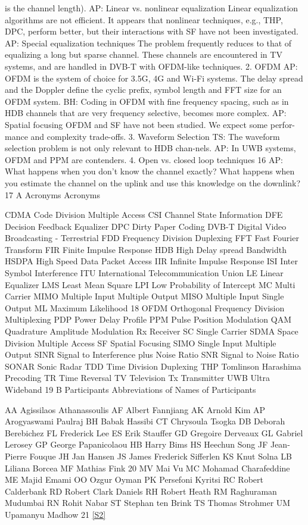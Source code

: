 \documentclass[11pt]{article}
\newcommand{\sref}[2]{\hyperlink{source:#1:#2}{[S#2]}}
\begin{document}
is the channel length). AP: Linear vs. nonlinear equalization Linear equalization algorithms are not efficient. It appears that nonlinear techniques, e.g., THP, DPC, perform better, but their interactions with SF have not been investigated. AP: Special equalization techniques The problem frequently reduces to that of equalizing a long but sparse channel. These channels are encountered in TV systems, and are handled in DVB-T with OFDM-like techniques. 2. OFDM AP: OFDM is the system of choice for 3.5G, 4G and Wi-Fi systems. The delay spread and the Doppler define the cyclic prefix, symbol length and FFT size for an OFDM system. BH: Coding in OFDM with fine frequency spacing, such as in HDB channels that are very frequency selective, becomes more complex. AP: Spatial focusing OFDM and SF have not been studied. We expect some perfor-mance and complexity trade-offs. 3. Waveform Selection TS: The waveform selection problem is not only relevant to HDB chan-nels. AP: In UWB systems, OFDM and PPM are contenders. 4. Open vs. closed loop techniques 16 AP: What happens when you don't know the channel exactly? What happens when you estimate the channel on the uplink and use this knowledge on the downlink? 17 A Acronyms Acronyms

CDMA Code Division Multiple Access CSI Channel State Information DFE Decision Feedback Equalizer DPC Dirty Paper Coding DVB-T Digital Video Broadcasting - Terrestrial FDD Frequency Division Duplexing FFT Fast Fourier Transform FIR Finite Impulse Response HDB High Delay spread Bandwidth HSDPA High Speed Data Packet Access IIR Infinite Impulse Response ISI Inter Symbol Interference ITU International Telecommunication Union LE Linear Equalizer LMS Least Mean Square LPI Low Probability of Intercept MC Multi Carrier MIMO Multiple Input Multiple Output MISO Multiple Input Single Output ML Maximum Likelihood 18 OFDM Orthogonal Frequency Division Multiplexing PDP Power Delay Profile PPM Pulse Position Modulation QAM Quadrature Amplitude Modulation Rx Receiver SC Single Carrier SDMA Space Division Multiple Access SF Spatial Focusing SIMO Single Input Multiple Output SINR Signal to Interference plus Noise Ratio SNR Signal to Noise Ratio SONAR Sonic Radar TDD Time Division Duplexing THP Tomlinson Harashima Precoding TR Time Reversal TV Television Tx Transmitter UWB Ultra Wideband 19 B Participants Abbreviations of Names of Participants

AA Agissilaos Athanassoulis AF Albert Fannjiang AK Arnold Kim AP Arogyaswami Paulraj BH Babak Hassibi CT Chrysoula Tsogka DB Deborah Berebichez FL Frederick Lee ES Erik Stauffer GD Gregoire Derveaux GL Gabriel Lerosey GP George Papanicolaou HB Harry Bims HS Heechun Song JF Jean-Pierre Fouque JH Jan Hansen JS James Frederick Sifferlen KS Knut Solna LB Liliana Borcea MF Mathias Fink 20 MV Mai Vu MC Mohamad Charafeddine ME Majid Emami OO Ozgur Oyman PK Persefoni Kyritsi RC Robert Calderbank RD Robert Clark Daniels RH Robert Heath RM Raghuraman Mudumbai RN Rohit Nabar ST Stephan ten Brink TS Thomas Strohmer UM Upamanyu Madhow 21 \sref{20001177}{2}
\end{document}
